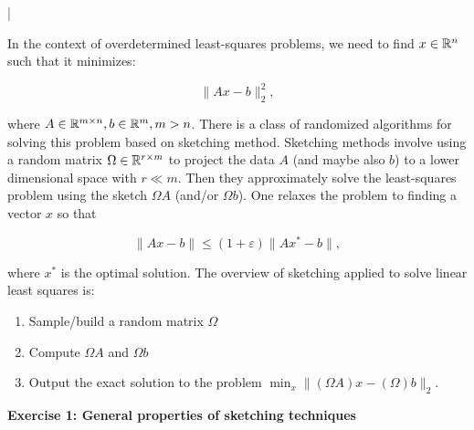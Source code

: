 \documentclass[11pt]{article}
\begin{document}
\lstset{frameround=fttt,language=Matlab}

\lstMakeShortInline[columns=fixed]|


In the context of overdetermined least-squares problems, we need to find $x \in \mathbb{R}^n$ such that it minimizes:

\[ \|Ax - b\|_2^2, \]

where $A \in \mathbb{R}^{m \times n}, b \in \mathbb{R}^{m}, m > n$. There is a class of randomized algorithms for solving this problem based on sketching method. Sketching methods involve using a random matrix $\Omega \in \mathbb{R}^{r \times m}$ to project the data $A$ (and maybe also $b$) to a lower dimensional space with $r \ll m$. Then they approximately solve the least-squares problem using the sketch $\Omega A$ (and/or $\Omega b$).  One relaxes the problem to finding a vector $x$ so that 

\[ \|Ax - b\| \leq (1 + \varepsilon)\|Ax^* - b\|, \]

where $x^*$ is the optimal solution. The overview of sketching applied to solve linear least squares is:

\begin{enumerate}
    \item Sample/build a random matrix $\Omega$
    \item Compute $\Omega A$ and $\Omega b$
    \item Output the exact solution to the problem $\min_{x} \| (\Omega A)x - (\Omega) b\|_2$.
\end{enumerate}

{\bf{Exercise 1: General properties of sketching techniques}}\\
\end{document}
